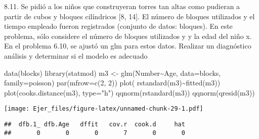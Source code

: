 \documentclass[
]{article}
\newenvironment{Shaded}{\begin{snugshade}}{\end{snugshade}}
\newcommand{\AttributeTok}[1]{\textcolor[rgb]{0.77,0.63,0.00}{#1}}
\newcommand{\DecValTok}[1]{\textcolor[rgb]{0.00,0.00,0.81}{#1}}
\newcommand{\FunctionTok}[1]{\textcolor[rgb]{0.00,0.00,0.00}{#1}}
\newcommand{\NormalTok}[1]{#1}
\newcommand{\OtherTok}[1]{\textcolor[rgb]{0.56,0.35,0.01}{#1}}
\newcommand{\SpecialCharTok}[1]{\textcolor[rgb]{0.00,0.00,0.00}{#1}}
\newcommand{\StringTok}[1]{\textcolor[rgb]{0.31,0.60,0.02}{#1}}
\begin{document}
8.11. Se pidió a los niños que construyeran torres tan altas como
pudieran a partir de cubos y bloques cilíndricos {[}8, 14{]}. El número
de bloques utilizados y el tiempo empleado fueron registrados (conjunto
de datos: bloques). En este problema, sólo considere el número de
bloques utilizados y y la edad del niño x. En el problema 6.10, se
ajustó un glm para estos datos. Realizar un diagnóstico análisis y
determinar si el modelo es adecuado

\begin{Shaded}
\begin{Highlighting}[]
 \FunctionTok{data}\NormalTok{(blocks)}
\FunctionTok{library}\NormalTok{(statmod)}
\NormalTok{ m3 }\OtherTok{\textless{}{-}} \FunctionTok{glm}\NormalTok{(Number}\SpecialCharTok{\textasciitilde{}}\NormalTok{Age, }\AttributeTok{data=}\NormalTok{blocks, }\AttributeTok{family=}\NormalTok{poisson)}
 \FunctionTok{par}\NormalTok{(}\AttributeTok{mfrow=}\FunctionTok{c}\NormalTok{(}\DecValTok{2}\NormalTok{, }\DecValTok{2}\NormalTok{))}
 \FunctionTok{plot}\NormalTok{( }\FunctionTok{rstandard}\NormalTok{(m3)}\SpecialCharTok{\textasciitilde{}}\FunctionTok{fitted}\NormalTok{(m3))}
 \FunctionTok{plot}\NormalTok{(}\FunctionTok{cooks.distance}\NormalTok{(m3), }\AttributeTok{type=}\StringTok{"h"}\NormalTok{)}
 \FunctionTok{qqnorm}\NormalTok{(}\FunctionTok{rstandard}\NormalTok{(m3))}
 \FunctionTok{qqnorm}\NormalTok{(}\FunctionTok{qresid}\NormalTok{(m3))}
\end{Highlighting}
\end{Shaded}

\texttt{[image: Ejer\_files/figure-latex/unnamed-chunk-29-1.pdf]}

\begin{Shaded}
\end{Shaded}

\begin{verbatim}
##  dfb.1_ dfb.Age   dffit   cov.r  cook.d     hat 
##       0       0       0       7       0       0
\end{verbatim}

\begin{Shaded}
\end{Shaded}
\end{document}
